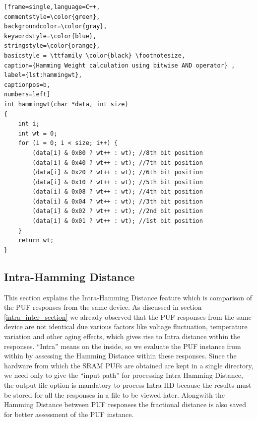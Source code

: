 \begin{center}
\begin{minipage}{0.7\textwidth}
\begin{lstlisting}[frame=single,language=C++,
commentstyle=\color{green},
backgroundcolor=\color{gray},
keywordstyle=\color{blue},
stringstyle=\color{orange},
basicstyle = \ttfamily \color{black} \footnotesize,
caption={Hamming Weight calculation using bitwise AND operator} ,
label={lst:hammingwt},
captionpos=b,
numbers=left]
int hammingwt(char *data, int size)
{
    int i;
    int wt = 0;
    for (i = 0; i < size; i++) {
        (data[i] & 0x80 ? wt++ : wt); //8th bit position
        (data[i] & 0x40 ? wt++ : wt); //7th bit position
        (data[i] & 0x20 ? wt++ : wt); //6th bit position
        (data[i] & 0x10 ? wt++ : wt); //5th bit position
        (data[i] & 0x08 ? wt++ : wt); //4th bit position
        (data[i] & 0x04 ? wt++ : wt); //3th bit position
        (data[i] & 0x02 ? wt++ : wt); //2nd bit position
        (data[i] & 0x01 ? wt++ : wt); //1st bit position
    }
    return wt;
}
\end{lstlisting}
\end{minipage}
\end{center}

\subsection{Intra-Hamming Distance}
\label{intra_hd_section}
This section explains the Intra-Hamming Distance feature which is comparison of the PUF responses from the same device. As discussed in section \ref{intra_inter_section} we already observed that the PUF responses from the same device are not identical due various factors like voltage fluctuation,  temperature variation and other aging effects, which gives rise to Intra distance within the responses. ``Intra'' means on the inside, so we evaluate the PUF instance from within by assessing the Hamming Distance within
these responses. Since the hardware from which the SRAM PUFs are obtained are kept in a single directory, we need only to give the ``input path'' for processing Intra Hamming Distance, the output file option is mandatory to process Intra HD because the results must be stored for all the responses in a file to be viewed later. Alongwith the Hamming Distance between PUF responses the fractional distance is also saved for better assessment of the PUF instance.\\

